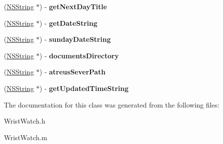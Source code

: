 \begin{DoxyCompactItemize}
\item 
\hypertarget{interface_wrist_watch_a2345f26f8160982f8c28e12c61339a1e}{
(\hyperlink{class_n_s_string}{NSString} $\ast$) -\/ {\bfseries getNextDayTitle}}
\label{interface_wrist_watch_a2345f26f8160982f8c28e12c61339a1e}

\item 
\hypertarget{interface_wrist_watch_a92662bfe007cbb3bd74b3faf649bd58c}{
(\hyperlink{class_n_s_string}{NSString} $\ast$) -\/ {\bfseries getDateString}}
\label{interface_wrist_watch_a92662bfe007cbb3bd74b3faf649bd58c}

\item 
\hypertarget{interface_wrist_watch_a01c6bce739f565bb36acc1204a8c35a6}{
(\hyperlink{class_n_s_string}{NSString} $\ast$) -\/ {\bfseries sundayDateString}}
\label{interface_wrist_watch_a01c6bce739f565bb36acc1204a8c35a6}

\item 
\hypertarget{interface_wrist_watch_ad703067865ecf6a00ed17cb119dd7d22}{
(\hyperlink{class_n_s_string}{NSString} $\ast$) -\/ {\bfseries documentsDirectory}}
\label{interface_wrist_watch_ad703067865ecf6a00ed17cb119dd7d22}

\item 
\hypertarget{interface_wrist_watch_a46d0a68c978008241a675930c8b4d0f0}{
(\hyperlink{class_n_s_string}{NSString} $\ast$) -\/ {\bfseries atreusSeverPath}}
\label{interface_wrist_watch_a46d0a68c978008241a675930c8b4d0f0}

\item 
\hypertarget{interface_wrist_watch_a2d932ab96774bcd2202cbde0c61f4460}{
(\hyperlink{class_n_s_string}{NSString} $\ast$) -\/ {\bfseries getUpdatedTimeString}}
\label{interface_wrist_watch_a2d932ab96774bcd2202cbde0c61f4460}

\end{DoxyCompactItemize}


The documentation for this class was generated from the following files:\begin{DoxyCompactItemize}
\item 
WristWatch.h\item 
WristWatch.m\end{DoxyCompactItemize}
